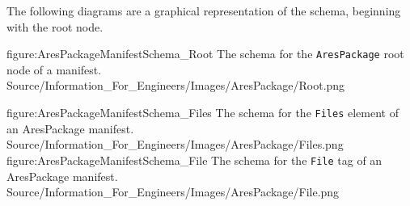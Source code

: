 The following diagrams are a graphical representation of the schema, beginning with the root node.

\FullPageLandscapeDiagram
    {figure:AresPackageManifestSchema_Root}
    {The schema for the {\tt AresPackage} root node of a manifest.}
    {Source/Information_For_Engineers/Images/AresPackage/Root.png}

\FullPageLandscapeDiagram
    {figure:AresPackageManifestSchema_Files}
    {The schema for the {\tt Files} element of an AresPackage manifest.}
    {Source/Information_For_Engineers/Images/AresPackage/Files.png}
\FullPageLandscapeDiagram
    {figure:AresPackageManifestSchema_File}
    {The schema for the {\tt File} tag of an AresPackage manifest.}
    {Source/Information_For_Engineers/Images/AresPackage/File.png}

